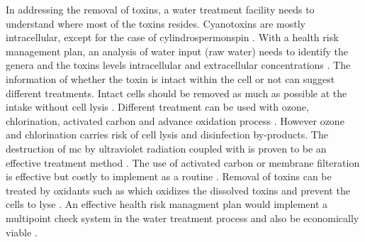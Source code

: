 In addressing the removal of toxins, a water treatment facility needs to understand where most of the toxins resides. Cyanotoxins are mostly intracellular, except for the case of cylindrospermonspin \cite{rastogi_cyanotoxin-microcystins:_2014}.
With a health risk management plan, an analysis of water input (raw water) needs to identify the genera and the toxins levels intracellular and extracellular concentrations \cite{saoudi_management_2017}. The information of whether the toxin is intact within the cell or not can suggest different treatments. Intact cells should be removed as much as possible at the intake without cell lysis \cite{westrick_review_2010}. Different treatment can be used with ozone, chlorination, activated carbon and advance oxidation process \cite{koreiviene_cyanotoxin_2014, westrick_cyanotoxin_2018}. However ozone and chlorination carries risk of cell lysis and disinfection by-products. The destruction of \gls{mc} by ultraviolet radiation coupled with  is proven to be an effective treatment method \cite{he_efficient_2012}. The use of activated carbon or membrane filteration is effective but costly to implement as a routine \cite{koreiviene_cyanotoxin_2014}. Removal of toxins can be treated by oxidants such as  which oxidizes the dissolved toxins and prevent the cells to lyse \cite{westrick_cyanotoxin_2018}. An effective health risk managment plan would implement a multipoint check system in the water treatment process and also be economically viable \cite{westrick_review_2010,saoudi_management_2017}.

